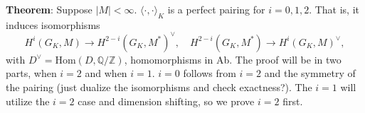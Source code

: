 \documentclass[class=article, crop=false]{standalone}
\begin{document}

\textbf{Theorem}: Suppose $|M|<\infty$. $\langle \cdot, \cdot \rangle_K$ is a perfect pairing for $i=0,1,2$. 
\vskip 3pt That is, it induces isomorphisms \[H^i(G_K,M) \to H^{2-i}(G_K, M^{*})^{\vee}, \quad  H^{2-i}(G_K,M^{*}) \to H^i(G_K, M)^{\vee},\]
with $D^{\vee} = \text{Hom}(D, \mathbb{Q}/\mathbb{Z})$, homomorphisms in Ab.
\vskip 5pt
The proof will be in two parts, when $i=2$ and when $i=1$. 
$i=0$ follows from $i=2$ and the symmetry of the pairing 
(just dualize the isomorphisms {\color{red} and check exactness?}). 
The $i=1$ will utilize the $i=2$ case and dimension shifting, so we prove $i=2$ first.
\end{document}
